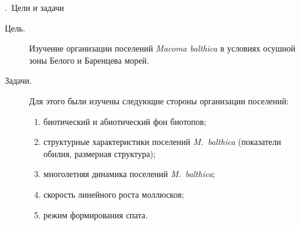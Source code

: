 \documentclass[aspectratio=169, xcolor=table]{beamer}
\begin{document}
\begin{frame}{\insertpagenumber.\ Цели и задачи}
\begin{description}
	\item[Цель.] Изучение организации поселений {\it Macoma balthica} в условиях осушной зоны Белого и Баренцева морей.

	\item[Задачи.]
Для этого были изучены следующие стороны организации поселений:
  \begin{enumerate}
    \item биотический и абиотический фон биотопов;
    \item структурные характеристики поселений \textit{M.~balthica} (показатели обилия, размерная структура);
    \item многолетняя динамика поселений \textit{M.~balthica};
    \item скорость линейного роста моллюсков;
    \item режим формирования спата.
  \end{enumerate}
\end{description}
\end{frame}
\end{document}
